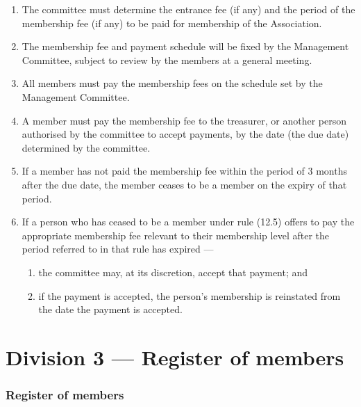 \begin{enumerate}

\item The committee must determine the entrance fee (if any) and the period of the membership fee (if any) to be paid for membership of the Association.
\item The membership fee and payment schedule will be fixed by the Management Committee, subject to review by the members at a general meeting.
\item All members must pay the membership fees on the schedule set by the Management Committee.
\item A member must pay the membership fee to the treasurer, or another person authorised by the committee to accept payments, by the date (the due date) determined by the committee.
\item If a member has not paid the membership fee within the period of 3 months after the due date, the member ceases to be a member on the expiry of that period.
\item If a person who has ceased to be a member under rule (12.5) offers to pay the appropriate membership fee relevant to their membership level after the period referred to in that rule has expired ---

  \begin{enumerate}
  
  \item the committee may, at its discretion, accept that payment; and
  \item if the payment is accepted, the person's membership is reinstated from the date the payment is accepted.
  \end{enumerate}
\end{enumerate}

\hypertarget{division-3-register-of-members}{%
\part*{Division 3 --- Register of members}\label{division-3-register-of-members}}

\hypertarget{register-of-members}{%
\section{Register of members}\label{register-of-members}}

